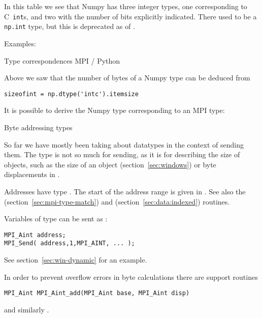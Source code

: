 In this table we see that
Numpy has three integer types,
one corresponding to C~\lstinline{int}s,
and two with the number of bits explicitly indicated.
There used to be a \lstinline{np.int} type,
but this is deprecated as of .

Examples:



 {Type correspondences MPI / Python}

Above we saw that the number of bytes of a Numpy type can be deduced from
\lstset{language=Python}
\begin{lstlisting}
sizeofint = np.dtype('intc').itemsize  
\end{lstlisting}

It is possible to derive the Numpy type corresponding to an MPI type:

\lstset{language=C}

 {Byte addressing types}
\label{sec:mpi-byte-type}

So far we have mostly been taking about datatypes in the context of
sending them. The  type is not so much for
sending, as it is for describing the size of objects, such as the size
of an  object (section~\ref{sec:windows})
or byte displacements in .

Addresses have type . The start of the address range is
given in .
See also the 
(section~\ref{sec:mpi-type-match})
and
(section~\ref{sec:data:indexed})
routines.

Variables of type  can be sent as :
\begin{lstlisting}
MPI_Aint address;
MPI_Send( address,1,MPI_AINT, ... );
\end{lstlisting}
See section~\ref{sec:win-dynamic} for an example.

In order to prevent overflow errors in byte calculations
there are support routines 
\begin{lstlisting}
MPI_Aint MPI_Aint_add(MPI_Aint base, MPI_Aint disp)
\end{lstlisting}
and similarly .

